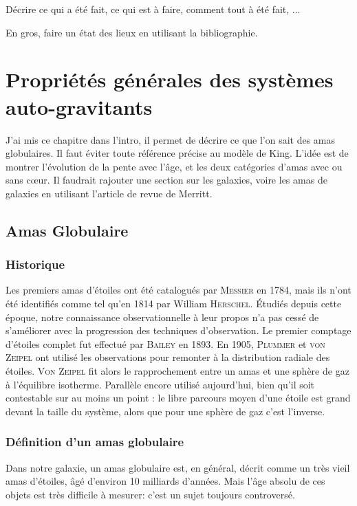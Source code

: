 Décrire ce qui a été fait, ce qui est à faire, comment tout à été fait, ...

En gros, faire un état des lieux en utilisant la bibliographie.
\normalsize

\chapter{Propriétés générales des systèmes auto-gravitants}

	J'ai mis ce chapitre dans l'intro, il permet de décrire ce que l'on sait des
	amas globulaires. Il faut éviter toute référence précise au modèle de King.
	L'idée est de montrer l'évolution de la pente avec l'âge, et les deux
	catégories d'amas avec ou sans c\oe ur. Il faudrait rajouter une section sur
	les galaxies, voire les amas de galaxies en utilisant l'article de revue de
	Merritt.

	\minitoc
	\section{Amas Globulaire}
		\subsection{Historique}
			Les premiers amas d'étoiles ont été catalogués par \textsc{Messier} en 1784,
			mais ils n'ont été identifiés comme tel qu'en 1814 par William
			\textsc{Herschel}. Étudiés depuis cette époque, notre connaissance
			observationnelle à leur propos n'a pas cessé de s'améliorer avec la progression
			des techniques d'observation. Le premier comptage d'étoiles complet fut
			effectué par \textsc{Bailey} en 1893. En 1905, \textsc{Plummer} et \textsc{von
			Zeipel}	ont utilisé les observations pour remonter à la distribution radiale
			des étoiles. \textsc{Von Zeipel} fit alors le rapprochement entre un amas et
			une sphère de gaz à l'équilibre isotherme. Parallèle encore utilisé
			aujourd'hui, bien qu'il soit contestable sur au moins un point : le libre
			parcours moyen d'une étoile est grand devant la taille du système, alors que
			pour une sphère de gaz c'est l'inverse.

		\subsection{Définition d'un amas globulaire}
			Dans notre galaxie, un amas globulaire est, en général, décrit comme un
			très vieil amas d'étoiles, âgé d'environ 10 milliards d'années. Mais
			l'âge absolu de ces objets est très difficile à mesurer: c'est un sujet
			toujours controversé.

